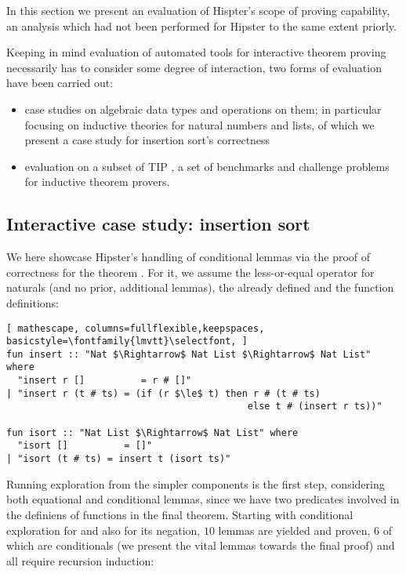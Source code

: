 \label{sec:evaluation}

In this section we present an evaluation of Hispter's scope of proving capability, an analysis which had not been performed for Hipster to the same extent priorly.

Keeping in mind evaluation of automated tools for interactive theorem proving necessarily has to consider some degree of interaction, two forms of evaluation have been carried out:

\begin{itemize}
\item case studies on algebraic data types and operations on them; in particular focusing on inductive theories for natural numbers and lists, of which we present a case study for insertion sort's correctness

\item evaluation on a subset of TIP \cite{tip-benchmarks}, a set of benchmarks and challenge problems for inductive theorem provers.
\end{itemize}

\subsection{Interactive case study: insertion sort}

We here showcase Hipster's handling of conditional lemmas via the proof of correctness for the theorem .
%
For it, we assume the less-or-equal operator \isaCode{$\le$} for naturals (and no prior, additional lemmas), the already defined  and the function definitions:

\begin{lstlisting}[ mathescape, columns=fullflexible,keepspaces, basicstyle=\fontfamily{lmvtt}\selectfont, ]
fun insert :: "Nat $\Rightarrow$ Nat List $\Rightarrow$ Nat List" where
  "insert r []          = r # []"
| "insert r (t # ts) = (if (r $\le$ t) then r # (t # ts)	
                                           else t # (insert r ts))"

fun isort :: "Nat List $\Rightarrow$ Nat List" where
  "isort []          = []"
| "isort (t # ts) = insert t (isort ts)"
\end{lstlisting}

Running exploration from the simpler components is the first step, considering both equational and conditional lemmas, since we have two predicates involved in the definiens of functions in the final theorem.
%
Starting with conditional exploration for \isaCode{$\le$} and also for its negation, $10$ lemmas are yielded and proven, $6$ of which are conditionals (we present the vital lemmas towards the final proof) and all require recursion induction:

